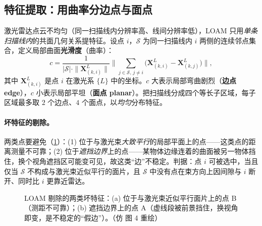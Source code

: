 \subsection{特征提取：用曲率分边点与面点}
\label{sec:lidar-loam-feat}

激光雷达点云不均匀（同一扫描线内分辨率高、线间分辨率低），LOAM 只用\emph{单条扫描线内}的共面几何关系提特征。设点 $i$，$\mathcal{S}$ 为同一扫描线内 $i$ 两侧的连续邻点集合，定义局部曲面\textbf{光滑度}（曲率）\cite{zhang2014loam}：
\begin{equation}
  c=\frac{1}{|\mathcal{S}|\cdot\|\mathbf{X}^L_{(k,i)}\|}\bigg\|\sum_{j\in\mathcal{S},\,j\neq i}\big(\mathbf{X}^L_{(k,i)}-\mathbf{X}^L_{(k,j)}\big)\bigg\|,
  \label{eq:lidar-loam-c}
\end{equation}
其中 $\mathbf{X}^L_{(k,i)}$ 是点 $i$ 在激光系 $\{L\}$ 中的坐标。$c$ 大表示局部弯曲剧烈（\textbf{边点 edge}），$c$ 小表示局部平坦（\textbf{面点 planar}）。把扫描线分成四个等长子区域，每子区域最多取 $2$ 个边点、$4$ 个面点，以\emph{均匀}分布特征。

\paragraph{坏特征的剔除。}
两类点要避免\cite{zhang2014loam}（\cref{fig:lidar-loam-feat}）：(1) 位于与激光束\emph{大致平行}的局部平面上的点——这类点的距离测量不可靠；(2) 位于\emph{遮挡边界}上的点——某物体边缘连着的曲面被另一物体挡住，换个视角遮挡区可能变可见，故这类“边”不稳定。判据：点 $i$ 可被选中，当且仅当 $\mathcal{S}$ 不构成与激光束近似平行的面片，且 $\mathcal{S}$ 中没有点在束方向上因间隙与 $i$ 断开、同时比 $i$ 更靠近雷达。

\begin{figure}[ht]
\centering
{}
\caption{LOAM 剔除的两类坏特征：(a) 位于与激光束近似平行面片上的点 B（测距不可靠）；(b) 遮挡边界上的点 A（虚线段被前景挡住，换视角即变，是不稳定的“假边”）。（仿 \cite{zhang2014loam} 图 4 重绘）}
\label{fig:lidar-loam-feat}
\end{figure}

